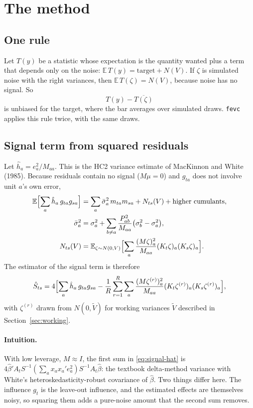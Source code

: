 \documentclass[11pt]{article}
\newcommand{\E}{\mathbb{E}}
\newcommand{\fevc}{\texttt{fevc}}
\begin{document}
\section{The method}\label{sec:method}

\subsection{One rule}

Let $T(y)$ be a statistic whose expectation is the quantity wanted plus a
term that depends only on the noise:
$\E\,T(y)=\text{target}+N(V)$. If $\zeta$ is simulated noise with the right
variances, then $\E\,T(\zeta)=N(V)$, because noise has no signal. So
\[
 T(y)-\overline{T(\zeta)}
\]
is unbiased for the target, where the bar averages over simulated draws.
\fevc{} applies this rule twice, with the same draws.

\subsection{Signal term from squared residuals}\label{sec:signal}

Let $\hat h_a=e_a^2/M_{aa}$. This is the HC2 variance estimate of
MacKinnon and White (1985). Because residuals contain no signal ($M\mu=0$)
and $g_{ta}$ does not involve unit $a$'s own error,
\begin{align}
 \E\Bigl[\sum_a\hat h_a\,g_{ta}g_{sa}\Bigr]
 &=\sum_a\bar\sigma_a^2\,m_{ta}m_{sa}+N_{ts}(V)+\text{higher cumulants},
 \label{eq:signal-expectation}\\
 \bar\sigma_a^2&=\sigma_a^2+\sum_{b\neq a}\frac{P_{ab}^2}{M_{aa}}
 \bigl(\sigma_b^2-\sigma_a^2\bigr),\label{eq:sigmabar}\\
 N_{ts}(V)&=\E_{\zeta\sim N(0,V)}\Bigl[\sum_a\frac{(M\zeta)_a^2}{M_{aa}}
 (K_t\zeta)_a(K_s\zeta)_a\Bigr].\label{eq:noise}
\end{align}
The estimator of the signal term is therefore
\begin{equation}\label{eq:signal-hat}
 \hat S_{ts}=4\Bigl[\sum_a\hat h_a\,g_{ta}g_{sa}
 -\frac1R\sum_{r=1}^R\sum_a\frac{(M\zeta^{(r)})_a^2}{M_{aa}}
 (K_t\zeta^{(r)})_a(K_s\zeta^{(r)})_a\Bigr],
\end{equation}
with $\zeta^{(r)}$ drawn from $N(0,\tilde V)$ for working variances
$\tilde V$ described in Section~\ref{sec:working}.

\paragraph{Intuition.} With low leverage, $M\approx I$, the first sum in
\eqref{eq:signal-hat} is $4\hat\beta'A_tS^{-1}(\sum_ax_ax_a'e_a^2)
S^{-1}A_t\hat\beta$: the textbook delta-method variance with White's
heteroskedasticity-robust covariance of $\hat\beta$. Two things differ here.
The influence $g_t$ is the leave-out influence, and the estimated effects are
themselves noisy, so squaring them adds a pure-noise amount that the second
sum removes.
\end{document}
